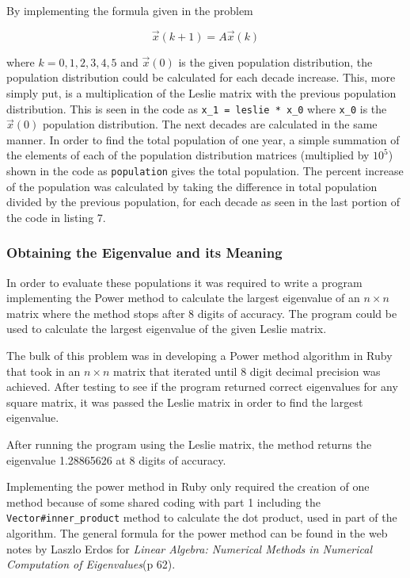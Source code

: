\documentclass[letterpaper,12pt]{article}
\begin{document}
\vspace{11pt}

By implementing the formula given in the problem

\[\vec{x}(k + 1) = A\vec{x}(k)\]
 
where $k = 0,1,2,3,4,5$ and $\vec{x}(0)$ is the given
population distribution, the population distribution could be calculated for
each decade increase.
This, more simply put, is a multiplication of the Leslie matrix with the
previous population distribution. This is seen in the code as
\texttt{x\_1 = leslie * x\_0} where \texttt{x\_0} is the $\vec{x}(0)$ population
distribution. The next decades are calculated in the same manner.
In order to find the total population of one year, a simple summation of the
elements of each of the population distribution matrices (multiplied by $10^5$)
shown in the code as \texttt{population} gives the total population.
The percent increase of the population was calculated by taking the difference
in total population divided by the previous population,
for each decade as seen in the last portion of the code in listing 7. 

\subsubsection{Obtaining the Eigenvalue and its Meaning}

In order to evaluate these populations it was required to write a program
implementing the Power method to calculate the largest eigenvalue of an
$n \times n$ matrix where the method stops after 8 digits of accuracy.
The program could be used to calculate the largest eigenvalue of the given
Leslie matrix.

The bulk of this problem was in developing a Power method algorithm in Ruby that
took in an $n \times n$ matrix that iterated until 8 digit decimal precision was
achieved.
After testing to see if the program returned correct eigenvalues for any square
matrix, it was passed the Leslie matrix in order to find the largest eigenvalue.

After running the program using the Leslie matrix, the method returns the
eigenvalue 1.28865626 at 8 digits of accuracy.

Implementing the power method in Ruby only required the creation of one method
because of some shared coding with part 1 including the
\texttt{Vector\#inner\_product} method to calculate the dot product,
used in part of the algorithm.
The general formula for the power method can be found in the web notes by Laszlo Erdos
for \textit{Linear Algebra: Numerical Methods in Numerical Computation of Eigenvalues}(p 62).
\end{document}
